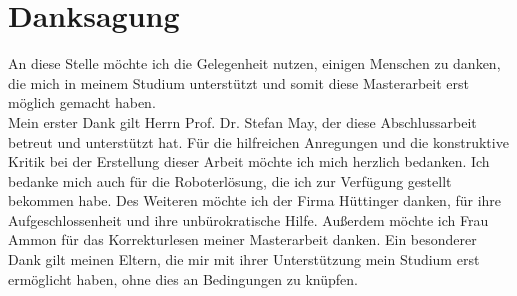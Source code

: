 \section*{Danksagung}

An diese Stelle möchte ich die Gelegenheit nutzen, einigen Menschen zu danken, die mich in meinem Studium unterstützt und somit diese Masterarbeit erst möglich gemacht haben.\\

Mein erster Dank gilt Herrn Prof. Dr. Stefan May, der diese Abschlussarbeit betreut und unterstützt hat. Für die hilfreichen Anregungen und die konstruktive Kritik bei der Erstellung dieser Arbeit möchte ich mich herzlich bedanken. Ich bedanke mich auch für die Roboterlösung, die ich zur Verfügung gestellt bekommen habe. Des Weiteren möchte ich der Firma Hüttinger danken, für ihre Aufgeschlossenheit und ihre unbürokratische Hilfe. Außerdem möchte ich Frau Ammon für das Korrekturlesen meiner Masterarbeit danken. Ein besonderer Dank gilt meinen Eltern, die mir mit ihrer Unterstützung mein Studium erst ermöglicht haben, ohne dies an Bedingungen zu knüpfen.